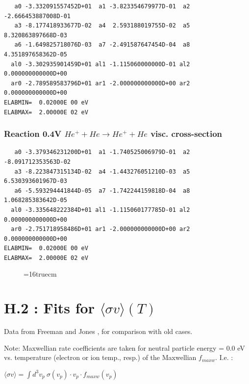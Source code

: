 \documentclass[12pt,dvips]{article}
\begin{document}
\begin{small}\begin{verbatim}
   a0 -3.332091557452D+01  a1 -3.823354679977D-01  a2 -2.666453887008D-01
   a3 -8.177418933677D-02  a4  2.593188019755D-02  a5  8.320863897668D-03
   a6 -1.649825718076D-03  a7 -2.491587647454D-04  a8  4.351897658362D-05
  al0 -3.302935901459D+01 al1 -1.115060000000D-01 al2  0.000000000000D+00
  ar0 -2.789589583796D+01 ar1 -2.000000000000D+00 ar2  0.000000000000D+00
ELABMIN=  0.02000E 00 eV
ELABMAX=  2.00000E 02 eV
\end{verbatim}\end{small}


\subsubsection{
Reaction 0.4V   $  He^+ + He \rightarrow He^+ + He $  visc. cross-section
}



\begin{small}\begin{verbatim}
   a0 -3.379346231200D+01  a1 -1.740525006979D-01  a2 -8.091712353563D-02
   a3 -8.223847315134D-02  a4 -1.443276051210D-03  a5  6.530393601967D-03
   a6 -5.593294441844D-05  a7 -1.742244159818D-04  a8  1.068285383642D-05
  al0 -3.335648222384D+01 al1 -1.115060177785D-01 al2  0.000000000000D+00
  ar0 -2.751718958486D+01 ar1 -2.000000000000D+00 ar2  0.000000000000D+00
ELABMIN=  0.02000E 00 eV
ELABMAX=  2.00000E 02 eV
\end{verbatim}\end{small}


\begin{figure} \label{0.4}
\epsfxsize=16truecm
\end{figure}
\newpage
\section{H.2 : Fits for $\langle\sigma v \rangle (T)$} \label{sect2}

\bigskip
Data from Freeman and Jones \cite{kn:Freeman},
for comparison with old cases.

Note: Maxwellian rate coefficients are taken for neutral particle energy = 0.0 eV
vs. temperature (electron or ion temp., resp.) of the Maxwellian $f_{maxw}$.
I.e. :

$\langle\sigma v \rangle = \int d^3v_p \ \sigma(v_{p}) \cdot v_{p} \cdot
f_{maxw}(v_{p})$
\end{document}
